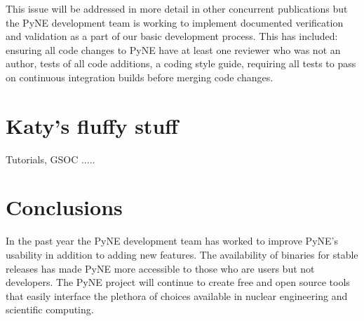 \documentclass{anstrans}
\begin{document}
This issue will be addressed in more detail in other concurrent publications but the PyNE development team is working to implement documented verification and validation as a part of our basic development process. This has included: ensuring all code changes to PyNE have at least one reviewer who was not an author, tests of all code additions, a coding style guide, requiring all tests to pass on continuous integration builds before merging code changes. 

\section{Katy's fluffy stuff} Tutorials, GSOC .....

\section{Conclusions}

In the past year the PyNE development team has worked to improve PyNE's usability in addition to adding new features. The availability of binaries for stable releases has made PyNE more accessible to those who are users but not developers. The PyNE project will continue to create free and open source tools that easily interface the plethora of choices available in nuclear engineering and scientific computing. 

 
 
\end{document}
